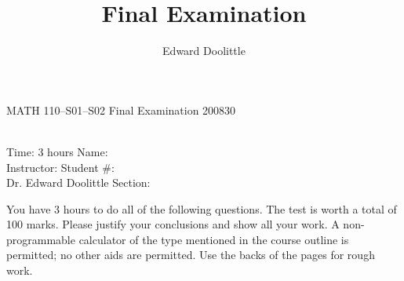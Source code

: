 \documentclass[12pt,legalpaper]{article}
\title{Final Examination}
\author{Edward Doolittle}
\begin{document}
\thispagestyle{plain}

\begin{center}
  \LARGE{MATH 110--S01--S02 Final Examination 200830}
\end{center}

\begin{flushleft}
\quad\\
Time:  3 hours                  \hfill       Name: \underline{\hspace{2in}}  \\
Instructor:                     \hfill Student \#: \underline{\hspace{2in}}  \\
\quad Dr. Edward Doolittle  \hfill    Section: \underline{\hspace{2in}}  \\
\end{flushleft}


\noindent
You have 3 hours to do all of the following questions.
The test is worth a total of 100 marks.
Please justify your conclusions and
show all your work.
A non-programmable calculator of the type mentioned in the course outline
is permitted; no other aids are permitted.
Use the backs of the pages for rough work.
\end{document}
